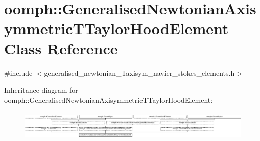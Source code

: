 \hypertarget{classoomph_1_1GeneralisedNewtonianAxisymmetricTTaylorHoodElement}{}\section{oomph\+:\+:Generalised\+Newtonian\+Axisymmetric\+T\+Taylor\+Hood\+Element Class Reference}
\label{classoomph_1_1GeneralisedNewtonianAxisymmetricTTaylorHoodElement}


{\ttfamily \#include $<$generalised\+\_\+newtonian\+\_\+\+Taxisym\+\_\+navier\+\_\+stokes\+\_\+elements.\+h$>$}

Inheritance diagram for oomph\+:\+:Generalised\+Newtonian\+Axisymmetric\+T\+Taylor\+Hood\+Element\+:\begin{figure}[H]
\begin{center}
\leavevmode
\includegraphics[height=1.424936cm]{classoomph_1_1GeneralisedNewtonianAxisymmetricTTaylorHoodElement}
\end{center}
\end{figure}
